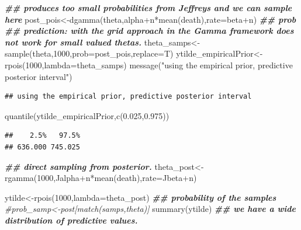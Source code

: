 \documentclass[
]{book}
\newenvironment{Shaded}{\begin{snugshade}}{\end{snugshade}}
\newcommand{\AttributeTok}[1]{\textcolor[rgb]{0.77,0.63,0.00}{#1}}
\newcommand{\CommentTok}[1]{\textcolor[rgb]{0.56,0.35,0.01}{\textit{#1}}}
\newcommand{\DecValTok}[1]{\textcolor[rgb]{0.00,0.00,0.81}{#1}}
\newcommand{\DocumentationTok}[1]{\textcolor[rgb]{0.56,0.35,0.01}{\textbf{\textit{#1}}}}
\newcommand{\FloatTok}[1]{\textcolor[rgb]{0.00,0.00,0.81}{#1}}
\newcommand{\FunctionTok}[1]{\textcolor[rgb]{0.00,0.00,0.00}{#1}}
\newcommand{\NormalTok}[1]{#1}
\newcommand{\OtherTok}[1]{\textcolor[rgb]{0.56,0.35,0.01}{#1}}
\newcommand{\SpecialCharTok}[1]{\textcolor[rgb]{0.00,0.00,0.00}{#1}}
\newcommand{\StringTok}[1]{\textcolor[rgb]{0.31,0.60,0.02}{#1}}
\theoremstyle{definition}
\theoremstyle{definition}
\theoremstyle{definition}
\theoremstyle{definition}
\theoremstyle{remark}
\begin{document}
\begin{Shaded}
\begin{Highlighting}[]
 \DocumentationTok{\#\# produces too small probabilities from Jeffrey\textquotesingle{}s and we can sample here}
\NormalTok{ post\_pois}\OtherTok{\textless{}{-}}\FunctionTok{dgamma}\NormalTok{(theta,alpha}\SpecialCharTok{+}\NormalTok{n}\SpecialCharTok{*}\FunctionTok{mean}\NormalTok{(death),}\AttributeTok{rate=}\NormalTok{beta}\SpecialCharTok{+}\NormalTok{n) }\DocumentationTok{\#\# prob}
\DocumentationTok{\#\#  prediction:  with the grid approach in the Gamma framework does not work for small valued thetas.}
\NormalTok{ theta\_samps}\OtherTok{\textless{}{-}}\FunctionTok{sample}\NormalTok{(theta,}\DecValTok{1000}\NormalTok{,}\AttributeTok{prob=}\NormalTok{post\_pois,}\AttributeTok{replace=}\NormalTok{T)}
\NormalTok{  ytilde\_empiricalPrior}\OtherTok{\textless{}{-}}\FunctionTok{rpois}\NormalTok{(}\DecValTok{1000}\NormalTok{,}\AttributeTok{lambda=}\NormalTok{theta\_samps)}
  \FunctionTok{message}\NormalTok{(}\StringTok{"using the empirical prior, predictive posterior interval"}\NormalTok{)}
\end{Highlighting}
\end{Shaded}

\begin{verbatim}
## using the empirical prior, predictive posterior interval
\end{verbatim}

\begin{Shaded}
\begin{Highlighting}[]
   \FunctionTok{quantile}\NormalTok{(ytilde\_empiricalPrior,}\FunctionTok{c}\NormalTok{(}\FloatTok{0.025}\NormalTok{,}\FloatTok{0.975}\NormalTok{))}
\end{Highlighting}
\end{Shaded}

\begin{verbatim}
##    2.5%   97.5% 
## 636.000 745.025
\end{verbatim}

\begin{Shaded}
\begin{Highlighting}[]
 \DocumentationTok{\#\# direct sampling from posterior.}
\NormalTok{ theta\_post}\OtherTok{\textless{}{-}}\FunctionTok{rgamma}\NormalTok{(}\DecValTok{1000}\NormalTok{,Jalpha}\SpecialCharTok{+}\NormalTok{n}\SpecialCharTok{*}\FunctionTok{mean}\NormalTok{(death),}\AttributeTok{rate=}\NormalTok{Jbeta}\SpecialCharTok{+}\NormalTok{n)}
 
 
\NormalTok{   ytilde}\OtherTok{\textless{}{-}}\FunctionTok{rpois}\NormalTok{(}\DecValTok{1000}\NormalTok{,}\AttributeTok{lambda=}\NormalTok{theta\_post) }
 \DocumentationTok{\#\# probability of the samples }
 \CommentTok{\#prob\_samp\textless{}{-}post[match(samps,theta)]}
  \FunctionTok{summary}\NormalTok{(ytilde) }\DocumentationTok{\#\# we have a wide distribution of predictive values.}
\end{Highlighting}
\end{Shaded}
\end{document}
